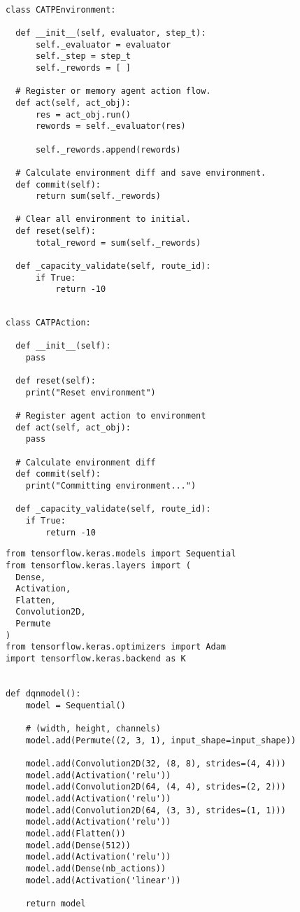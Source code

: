 \begin{lstlisting}[caption = 環境を構築するクラス, label = program1]

class CATPEnvironment:

  def __init__(self, evaluator, step_t):
      self._evaluator = evaluator
      self._step = step_t
      self._rewords = [ ]

  # Register or memory agent action flow.
  def act(self, act_obj):
      res = act_obj.run()
      rewords = self._evaluator(res)

      self._rewords.append(rewords)
  
  # Calculate environment diff and save environment.
  def commit(self):
      return sum(self._rewords)
  
  # Clear all environment to initial.
  def reset(self):
      total_reword = sum(self._rewords)

  def _capacity_validate(self, route_id):
      if True:
          return -10
\end{lstlisting}
  




\begin{lstlisting}[caption = 行動を定義するクラス, label = program1]

class CATPAction:

  def __init__(self):
    pass

  def reset(self):
    print("Reset environment")

  # Register agent action to environment
  def act(self, act_obj):
    pass

  # Calculate environment diff
  def commit(self):
    print("Committing environment...")

  def _capacity_validate(self, route_id):  
    if True:
        return -10  
\end{lstlisting}
  
  


\begin{lstlisting}[caption = DQNの深層学習部分を形成するモデル, label = program1]
from tensorflow.keras.models import Sequential
from tensorflow.keras.layers import (
  Dense,
  Activation,
  Flatten,
  Convolution2D,
  Permute
)
from tensorflow.keras.optimizers import Adam
import tensorflow.keras.backend as K


def dqnmodel():
    model = Sequential()

    # (width, height, channels)
    model.add(Permute((2, 3, 1), input_shape=input_shape))

    model.add(Convolution2D(32, (8, 8), strides=(4, 4)))
    model.add(Activation('relu'))
    model.add(Convolution2D(64, (4, 4), strides=(2, 2)))
    model.add(Activation('relu'))
    model.add(Convolution2D(64, (3, 3), strides=(1, 1)))
    model.add(Activation('relu'))
    model.add(Flatten())
    model.add(Dense(512))
    model.add(Activation('relu'))
    model.add(Dense(nb_actions))
    model.add(Activation('linear'))

    return model


\end{lstlisting}




